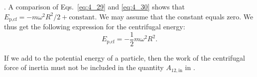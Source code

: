 . A comparison of Eqs.~\eqref{eq:4_29} and \eqref{eq:4_30} shows that $E_{\text{p,cf}}=-m\omega^2R^2/2 + \text{constant}$. We may assume that the constant equals zero. We thus get the following expression for the centrifugal energy:
\begin{equation}\label{eq:4_31}
E_{\text{p,cf}} = -\frac{1}{2} m \omega^2 R^2.
\end{equation}

If we add  to the potential energy of a particle, then the work of the centrifugal force of inertia must not be included in the quantity $A_{12,\text{in}}$ in .
